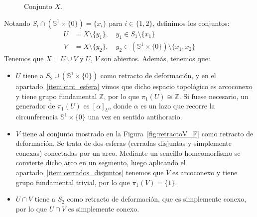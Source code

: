 \begin{ejercicio}
\begin{enumerate}[label=\alph*)]
\begin{figure}[h]
                \caption{Conjunto $X$.}
                \label{fig:conjuntoX_F}
            \end{figure}
            Notando $S_i\cap (\mathbb{S}^1\times \{0\}) = \{x_i\}$ para $i \in \{1,2\}$, definimos los conjuntos:
            \begin{align*}
                U &= X\setminus \{y_1\}, \quad y_1 \in S_1\setminus \{x_1\} \\
                V &= X\setminus \{y_2\}, \quad y_2 \in (\mathbb{S}^1\times \{0\})\setminus \{x_1,x_2\}
            \end{align*}
            Tenemos que $X=U\cup V$ y $U$, $V$ son abiertos. Además, tenemos que:
            \begin{itemize}
                \item $U$ tiene a $S_2\cup (\mathbb{S}^1\times \{0\})$ como retracto de deformación, y en el apartado~\ref{item:circ_esfera} vimos que dicho espacio topológico es arcoconexo y tiene grupo fundamental $\mathbb{Z}$, por lo que $\pi_1(U)\cong \mathbb{Z}$. Si fuese necesario, un generador de $\pi_1(U)$ es $[\alpha]_U$, donde $\alpha$ es un lazo que recorre la circunferencia $\mathbb{S}^1\times \{0\}$ una vez en sentido antihorario.
                \item $V$ tiene al conjunto mostrado en la Figura~\ref{fig:retractoV_F} como retracto de deformación. Se trata de dos esferas (cerradas disjuntas y simplemente conexas) conectadas por un arco. Mediante un sencillo homeomorfismo se convierte dicho arco en un segmento, luego aplicando el apartado~\ref{item:cerrados_disjuntos} tenemos que $V$ es arcoconexo y tiene grupo fundamental trivial, por lo que $\pi_1(V) = \{1\}$.
                \item $U\cap V$ tiene a $S_2$ como retracto de deformación, que es simplemente conexo, por lo que $U\cap V$ es simplemente conexo.
                \begin{figure}[h]
                        \centering
\end{figure}
\end{itemize}
\end{enumerate}
\end{ejercicio}
